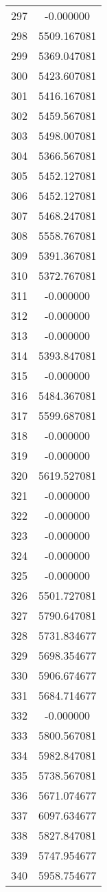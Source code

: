 \documentclass[12pt]{article}
\begin{document}
\begin{longtable}{@{}cc@{}}
297 & -0.000000 \\
298 & 5509.167081 \\
299 & 5369.047081 \\
300 & 5423.607081 \\
301 & 5416.167081 \\
302 & 5459.567081 \\
303 & 5498.007081 \\
304 & 5366.567081 \\
305 & 5452.127081 \\
306 & 5452.127081 \\
307 & 5468.247081 \\
308 & 5558.767081 \\
309 & 5391.367081 \\
310 & 5372.767081 \\
311 & -0.000000 \\
312 & -0.000000 \\
313 & -0.000000 \\
314 & 5393.847081 \\
315 & -0.000000 \\
316 & 5484.367081 \\
317 & 5599.687081 \\
318 & -0.000000 \\
319 & -0.000000 \\
320 & 5619.527081 \\
321 & -0.000000 \\
322 & -0.000000 \\
323 & -0.000000 \\
324 & -0.000000 \\
325 & -0.000000 \\
326 & 5501.727081 \\
327 & 5790.647081 \\
328 & 5731.834677 \\
329 & 5698.354677 \\
330 & 5906.674677 \\
331 & 5684.714677 \\
332 & -0.000000 \\
333 & 5800.567081 \\
334 & 5982.847081 \\
335 & 5738.567081 \\
336 & 5671.074677 \\
337 & 6097.634677 \\
338 & 5827.847081 \\
339 & 5747.954677 \\
340 & 5958.754677 \\

\end{longtable}
\end{document}
